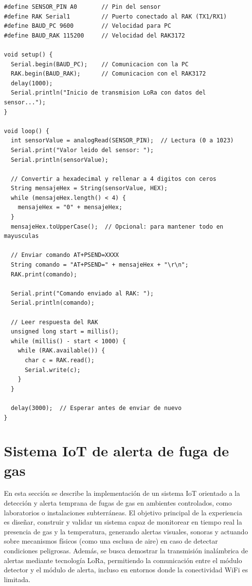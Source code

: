 \begin{lstlisting}[style=cppstyle, label={lst:codigo_sensor}, caption={Código de Arduino para enviar datos del sensor a través de LoRa}]
#define SENSOR_PIN A0       // Pin del sensor
#define RAK Serial1         // Puerto conectado al RAK (TX1/RX1)
#define BAUD_PC 9600        // Velocidad para PC
#define BAUD_RAK 115200     // Velocidad del RAK3172

void setup() {
  Serial.begin(BAUD_PC);    // Comunicacion con la PC
  RAK.begin(BAUD_RAK);      // Comunicacion con el RAK3172
  delay(1000);
  Serial.println("Inicio de transmision LoRa con datos del sensor...");
}

void loop() {
  int sensorValue = analogRead(SENSOR_PIN);  // Lectura (0 a 1023)
  Serial.print("Valor leido del sensor: ");
  Serial.println(sensorValue);

  // Convertir a hexadecimal y rellenar a 4 digitos con ceros
  String mensajeHex = String(sensorValue, HEX);
  while (mensajeHex.length() < 4) {
    mensajeHex = "0" + mensajeHex;
  }
  mensajeHex.toUpperCase();  // Opcional: para mantener todo en mayusculas

  // Enviar comando AT+PSEND=XXXX
  String comando = "AT+PSEND=" + mensajeHex + "\r\n";
  RAK.print(comando);

  Serial.print("Comando enviado al RAK: ");
  Serial.println(comando);

  // Leer respuesta del RAK
  unsigned long start = millis();
  while (millis() - start < 1000) {
    while (RAK.available()) {
      char c = RAK.read();
      Serial.write(c);
    }
  }

  delay(3000);  // Esperar antes de enviar de nuevo
}
\end{lstlisting}

\section{Sistema IoT de alerta de fuga de gas}

En esta sección se describe la implementación de un sistema IoT orientado a la detección y alerta temprana de fugas de gas en ambientes controlados, como laboratorios o instalaciones subterráneas. El objetivo principal de la experiencia es diseñar, construir y validar un sistema capaz de monitorear en tiempo real la presencia de gas y la temperatura, generando alertas visuales, sonoras y actuando sobre mecanismos físicos (como una esclusa de aire) en caso de detectar condiciones peligrosas. Además, se busca demostrar la transmisión inalámbrica de alertas mediante tecnología LoRa, permitiendo la comunicación entre el módulo detector y el módulo de alerta, incluso en entornos donde la conectividad WiFi es limitada.

